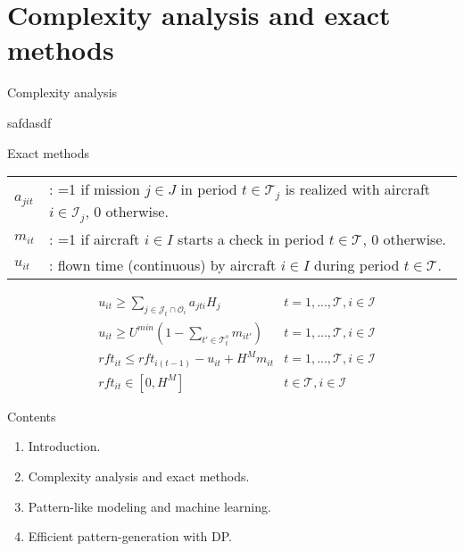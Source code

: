 \section{Complexity analysis and exact methods}

\begin{frame}

\begin{block}{Complexity analysis}

safdasdf

\end{block}

\end{frame}

\begin{frame}

\begin{block}{Exact methods}

\begin{tabular}{p{15mm}p{110mm}}
  $a_{jit}$ &  :  =1 if mission $j \in J$ in period $t \in \mathcal{T}_j$ is realized with aircraft $i \in \mathcal{I}_j$, 0 otherwise.  \\
  $m_{it}$   & :  =1 if aircraft $i \in I$ starts a check in period $t \in \mathcal{T}$, 0 otherwise.  \\
  $u_{it}$    &:  flown time (continuous) by aircraft $i \in I$ during period $t \in \mathcal{T}$. \\
\end{tabular}

\begin{align}
 & u_{it} \geq \sum_{j \in \mathcal{J}_t \cap \mathcal{O}_i} a_{jti} H_j 
    & t =1, ..., \mathcal{T}, i \in \mathcal{I} \label{eq:flight1}\\
 & u_{it} \geq U^{min} (1 - \sum_{t' \in \mathcal{T}^s_t} m_{it'})
    & t =1, ..., \mathcal{T}, i \in \mathcal{I} \label{eq:flight2}\\
 & rft_{it} \leq rft_{i(t-1)} - u_{it} + H^M m_{it}
    & t =1, ..., \mathcal{T}, i \in \mathcal{I} \label{eq:first_rft_upper}\\
& rft_{it} \in [0,H^M]
      & t \in \mathcal{T}, i \in \mathcal{I} \label{eq:first-mu}
\end{align}

\end{block}

\begin{block}{Contents}

\begin{enumerate}[<+->]

\item
  Introduction.
\item
  Complexity analysis and exact methods.
\item
  Pattern-like modeling and machine learning.
\item
  Efficient pattern-generation with DP.
\end{enumerate}

\end{block}

\end{frame}